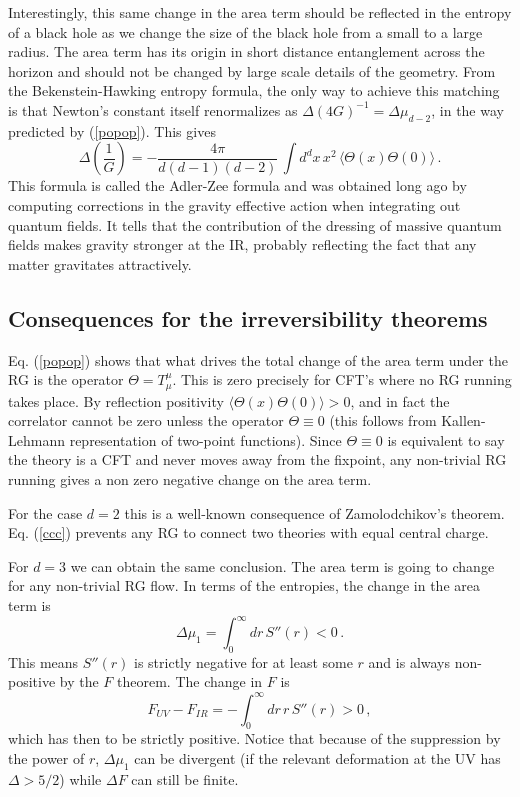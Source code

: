 \documentclass[11pt]{article}
\numberwithin{equation}{section}
\newcommand{\be}{\begin{equation}}
\newcommand{\ee}{\end{equation}}
\begin{document}
\bigskip

Interestingly, this same change in the area term should be reflected in the entropy of a black hole as we change the size of the black hole from a small to a large radius. The area term has its origin in short distance entanglement across the horizon and should not be changed by large scale details of the geometry. From the Bekenstein-Hawking entropy formula, the only way to achieve this matching is that Newton's constant itself renormalizes as $\Delta (4G)^{-1}=\Delta \mu_{d-2}$, in the way predicted by (\ref{popop}). This gives
\be
\Delta \left(\frac{1}{G}\right)= -\frac{4\pi}{d (d-1)(d-2)}\,\int d^{d}x\,x^2\,\langle \Theta(x) \Theta(0)\rangle\,.
\ee
This formula is called the Adler-Zee formula and was obtained long ago by computing corrections in the gravity effective action when integrating out quantum fields. It tells that the contribution of the dressing of massive quantum fields makes gravity stronger at the IR, probably reflecting the fact that any matter gravitates attractively.     

\subsection{Consequences for the irreversibility theorems}
Eq. (\ref{popop}) shows that what drives the total change of the area term under the RG is the operator $\Theta=T_\mu^\mu$. This is zero precisely for CFT's where no RG running takes place. By reflection positivity $\langle \Theta(x) \Theta(0)\rangle>0$, and in fact the correlator cannot be zero unless the operator $\Theta\equiv 0$ (this follows from Kallen-Lehmann representation of two-point functions). Since $\Theta\equiv 0$ is equivalent to say the theory is a CFT and never moves away from the fixpoint, any non-trivial RG running gives a non zero negative change on the area term. 

For the case $d=2$ this is a well-known consequence of Zamolodchikov's theorem. Eq. (\ref{ccc}) prevents any RG to connect two theories with equal central charge.     

For $d=3$ we can obtain the same conclusion. The area term is going to change for any non-trivial RG flow. In terms of the entropies, the change in the area term is
\be
\Delta \mu_{1}= \int_0^\infty dr\, S''(r)<0\,.
\ee
This means $S''(r)$ is strictly negative for at least some $r$ and is always non-positive by the $F$ theorem. The change in $F$ is
\be
 F_{UV}-F_{IR}= -\int_0^\infty dr\, r\, S''(r)>0\,,
\ee
which has then to be strictly positive. Notice that because of the suppression by the power of $r$, $\Delta \mu_1$ can be divergent (if the relevant deformation at the UV has $\Delta> 5/2$) while $\Delta F$ can still be finite. 
\end{document}
